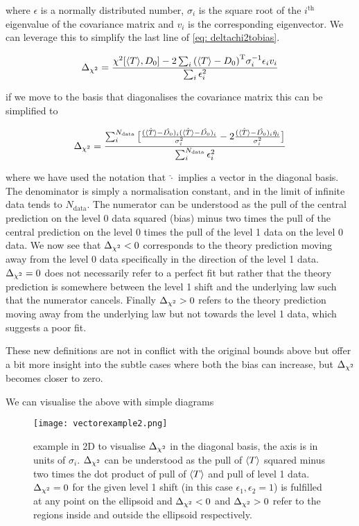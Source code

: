 where $\epsilon$ is a normally distributed number, $\sigma_{i}$ is the square root
of the $i^{\mathrm{th}}$ eigenvalue of the covariance matrix and $v_{i}$ is the
corresponding eigenvector. We can leverage this to simplify the last line of
\eqref{eq: deltachi2tobias}.

\begin{equation}
    \Delta_{\chi^{2}} = \frac{ \chi^{2}[\langle T \rangle, D_{0}] - 2 \sum_{i} {(\langle T \rangle - D_{0})}^{\mathrm{T}} \sigma_{i}^{-1} \epsilon_{i} v_{i} }{ \sum_{i} \epsilon_{i}^{2} }
\end{equation}

if we move to the basis that diagonalises the covariance matrix this can be simplified to

\begin{equation}
    \Delta_{\chi^{2}} = \frac{ \sum_{i}^{N_{\mathrm{data}}} \big[ 
        \frac{(\hat{\langle T \rangle} - \hat{D_{0}})_{i} (\hat{\langle T \rangle} - \hat{D_{0}})_{i}}{\sigma_{i}^{2}} -
        2 \frac{(\hat{\langle T \rangle} - \hat{D_{0}})_{i} \hat{\eta}_{i}}{\sigma_{i}^{2}} \big] }{
            \sum_{i}^{N_{\mathrm{data}}} \epsilon_{i}^{2} }
\end{equation}

where we have used the notation that $\hat{\cdot}$ implies a vector in the
diagonal basis. The denominator is simply a normalisation constant, and in the
limit of infinite data tends to $N_{\mathrm{data}}$. The numerator can be understood
as the pull of the central prediction on the level 0 data squared (bias)
minus two times the pull of the central prediction on the level 0 times the pull
of the level 1 data on the level 0 data. We now see that $\Delta_{\chi^{2}} < 0$ corresponds
to the theory prediction moving away from the level 0 data specifically in the
direction of the level 1 data. $\Delta_{\chi^{2}} = 0$ does not necessarily refer to a perfect
fit but rather that the theory prediction is somewhere between the level 1 shift
and the underlying law such that the numerator cancels. Finally $\Delta_{\chi^{2}} > 0$ refers
to the theory prediction moving away from the underlying law but not towards the
level 1 data, which suggests a poor fit. 

These new definitions are not in conflict with the original bounds above but
offer a bit more insight into the subtle cases where both the bias can increase,
but $\Delta_{\chi^{2}}$ becomes closer to zero.

We can visualise the above with simple diagrams

\begin{figure}[!h]
    \centering
    \texttt{[image: vectorexample2.png]}
    \caption{example in 2D to visualise $\Delta_{\chi^{2}}$ in the diagonal basis, the axis
    is in units of $\sigma_{i}$. $\Delta_{\chi^{2}}$ can be understood as the pull of
    $\langle T \rangle$ squared minus two times the dot product of pull of $\langle T \rangle$ and pull of
    level 1 data. $\Delta_{\chi^{2}} = 0$ for the given level 1 shift (in this case
    $\epsilon_1, \epsilon_2 = 1$) is fulfilled at any point on the ellipsoid and
    $\Delta_{\chi^{2}}<0$ and $\Delta_{\chi^{2}}>0$ refer to the regions inside and outside the ellipsoid
    respectively.}
    \label{fig:vectorexample}
\end{figure}

